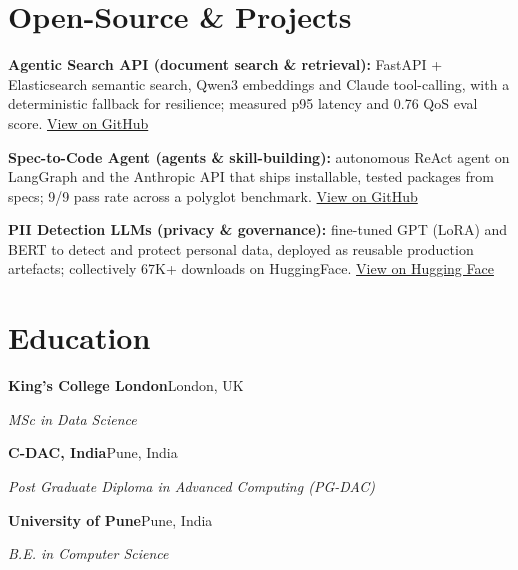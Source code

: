 \documentclass[10pt,a4paper]{article}
\begin{document}
\section{Open-Source \& Projects}
\begin{tight}
  \item \textbf{Agentic Search API (document search \& retrieval):} FastAPI + Elasticsearch semantic search, Qwen3 embeddings and Claude tool-calling, with a deterministic fallback for resilience; measured p95 latency and 0.76 QoS eval score. \href{https://github.com/abhijeetscode/search-agent}{View on GitHub}
  \item \textbf{Spec-to-Code Agent (agents \& skill-building):} autonomous ReAct agent on LangGraph and the Anthropic API that ships installable, tested packages from specs; 9/9 pass rate across a polyglot benchmark. \href{https://github.com/abhijeetscode/Spec-to-Code-Agent}{View on GitHub}
  \item \textbf{PII Detection LLMs (privacy \& governance):} fine-tuned GPT (LoRA) and BERT to detect and protect personal data, deployed as reusable production artefacts; collectively 67K+ downloads on HuggingFace. \href{https://huggingface.co/ab-ai/pii_model}{View on Hugging Face}
\end{tight}

\section{Education}
{\color{company}\bfseries King's College London}\hfill {\color{muted}London, UK}\par
{\itshape MSc in Data Science}\par\vspace{2pt}
{\color{company}\bfseries C-DAC, India}\hfill {\color{muted}Pune, India}\par
{\itshape Post Graduate Diploma in Advanced Computing (PG-DAC)}\par\vspace{2pt}
{\color{company}\bfseries University of Pune}\hfill {\color{muted}Pune, India}\par
{\itshape B.E. in Computer Science}\par
\end{document}
